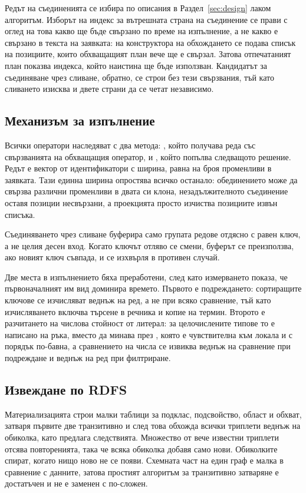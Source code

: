 Редът на съединенията се избира по описания в Раздел~\ref{sec:design} лаком алгоритъм.
Изборът на индекс за вътрешната страна на съединение се прави с оглед на това какво ще
бъде свързано по време на изпълнение, а не какво е свързано в текста на заявката: на
конструктора на обхождането се подава списък на позициите, които обхващащият план вече
ще е свързал. Затова отпечатаният план показва индекса, който наистина ще бъде използван.
Кандидатът за съединяване чрез сливане, обратно, се строи без тези свързвания, тъй като
сливането изисква и двете страни да се четат независимо.

\subsection{Механизъм за изпълнение}

Всички оператори наследяват  с два метода: , който получава
реда със свързванията на обхващащия оператор, и , който попълва следващото
решение. Редът е вектор от идентификатори с ширина, равна на броя променливи в заявката.
Тази единна ширина опростява всичко останало: обединението може да свързва различни
променливи в двата си клона, незадължителното съединение оставя позиции несвързани, а
проекцията просто изчиства позициите извън списъка.

Съединяването чрез сливане буферира само групата редове отдясно с равен ключ, а не целия
десен вход. Когато ключът отляво се смени, буферът се преизползва, ако новият ключ съвпада,
и се изхвърля в противен случай.

Две места в изпълнението бяха преработени, след като измерването показа, че първоначалният
им вид доминира времето. Първото е подреждането: сортиращите ключове се изчисляват веднъж
на ред, а не при всяко сравнение, тъй като изчисляването включва търсене в речника и копие
на термин. Второто е разчитането на числова стойност от литерал: за целочислените типове
то е написано на ръка, вместо да минава през , която е чувствителна към
локала и с порядък по-бавна, а сравнението на числа се извиква веднъж на сравнение при
подреждане и веднъж на ред при филтриране.

\subsection{Извеждане по RDFS}

Материализацията строи малки таблици за подклас, подсвойство, област и обхват, затваря
първите две транзитивно и след това обхожда всички триплети веднъж на обиколка, като
предлага следствията. Множество от вече известни триплети отсява повторенията, така че
всяка обиколка добавя само нови. Обиколките спират, когато нищо ново не се появи.
Схемната част на един граф е малка в сравнение с данните, затова простият алгоритъм за
транзитивно затваряне е достатъчен и не е заменен с по-сложен.


